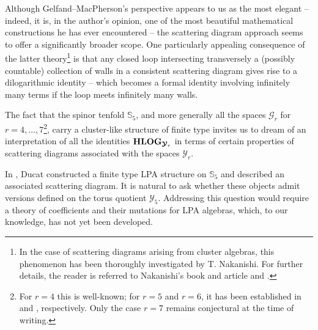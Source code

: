 \documentclass[11pt]{amsart}
\newcommand{\sk}{\smallskip}
\begin{document}
Although Gelfand--MacPherson's perspective appears to us as the most elegant -- indeed, it is, in the author's opinion, one of the most beautiful mathematical constructions  he has ever encountered -- the scattering diagram approach seems to offer a significantly broader scope. 
One particularly  appealing consequence of the latter theory\footnote{In the case of scattering diagrams arising from cluster algebras, this phenomenon has been thoroughly investigated by 
 {T. Nakanishi}. For further details, the reader is referred to Nakanishi's book and article \cite{NakanishiBook} and \cite{Nakanishi}.} is that any closed loop intersecting transversely a (possibly countable) collection of walls in a consistent scattering diagram gives rise to a dilogarithmic identity -- which becomes a formal identity involving infinitely many terms if the loop meets infinitely many walls.
\sk 



The fact that the spinor tenfold $\mathbb S_5$, and more generally all the spaces $\boldsymbol{\mathcal G}_r$ for $r = 4, \dots, 7$\footnote{For $r=4$ this is well-known; for $r=5$ and $r=6$, it has been established in \cite{Ducat} and \cite{DaiseyDucat}, respectively. Only the case $r=7$ remains conjectural at the time of writing.}, carry a cluster-like structure of finite type invites us to dream of an interpretation of all the identities 
${\bf HLOG}_{\boldsymbol{\mathcal Y}_r}$  in terms of certain properties of scattering diagrams associated with the spaces $\boldsymbol{\mathcal Y}_r$.





In \cite{Ducat}, Ducat constructed a finite type LPA structure on $\mathbb S_5$ and  described an associated scattering diagram. 
It is natural to ask whether these objects admit versions defined on the torus quotient $\boldsymbol{\mathcal Y}_5$. Addressing this question would require a theory of coefficients and their mutations for LPA algebras, which, to our knowledge, has not yet been developed.
\end{document}
